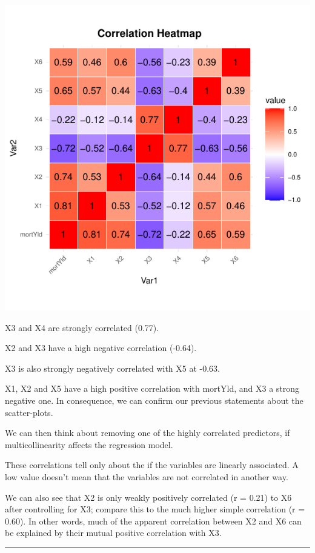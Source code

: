 \documentclass[
  11pt,
]{article}
\begin{document}
\includegraphics{Figs/unnamed-chunk-7-1.pdf}

X3 and X4 are strongly correlated (0.77).

X2 and X3 have a high negative correlation (-0.64).

X3 is also strongly negatively correlated with X5 at -0.63.

X1, X2 and X5 have a high positive correlation with mortYld, and X3 a
strong negative one. In consequence, we can confirm our previous
statements about the scatter-plots.

We can then think about removing one of the highly correlated
predictors, if multicollinearity affects the regression model.

These correlations tell only about the if the variables are linearly
associated. A low value doesn't mean that the variables are not
correlated in another way.

We can also see that X2 is only weakly positively correlated (r = 0.21)
to X6 after controlling for X3; compare this to the much higher simple
correlation (r = 0.60). In other words, much of the apparent correlation
between X2 and X6 can be explained by their mutual positive correlation
with X3.

\begin{center}\rule{0.5\linewidth}{0.5pt}\end{center}
\end{document}
